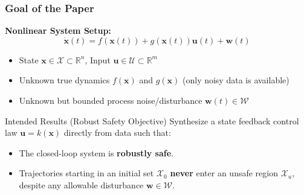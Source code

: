 \documentclass[8pt, hyperref={bookmarks=false},aspectratio=169, xcolor=table]{beamer}
\begin{document}
\begin{frame}\frametitle{Goal of the Paper}
  \textbf{Nonlinear System Setup:}
  \begin{equation*}
    \dot{\mathbf{x}}(t) = f(\mathbf{x}(t)) + g(\mathbf{x}(t)) \mathbf{u}(t) + \mathbf{w}(t)
  \end{equation*}
  \begin{itemize}
    \item State $\mathbf{x} \in \mathcal{X} \subset \mathbb{R}^n$, Input $\mathbf{u} \in \mathcal{U} \subset \mathbb{R}^m$
    \item Unknown true dynamics $f(\mathbf{x})$ and $g(\mathbf{x})$ (only noisy data is available)
    \item Unknown but bounded process noise/disturbance $\mathbf{w}(t) \in \mathcal{W}$
  \end{itemize}
  
  \vspace{0.3cm}
  \begin{block}{Intended Results (Robust Safety Objective)}
    Synthesize a state feedback control law $\mathbf{u} = k(\mathbf{x})$ directly from data such that:
    \begin{itemize}
      \item The closed-loop system is \textbf{robustly safe}.
      \item Trajectories starting in an initial set $\mathcal{X}_0$ \textbf{never} enter an unsafe region $\mathcal{X}_u$, despite any allowable disturbance $\mathbf{w} \in \mathcal{W}$.
    \end{itemize}
  \end{block}
\end{frame}

\end{document}
